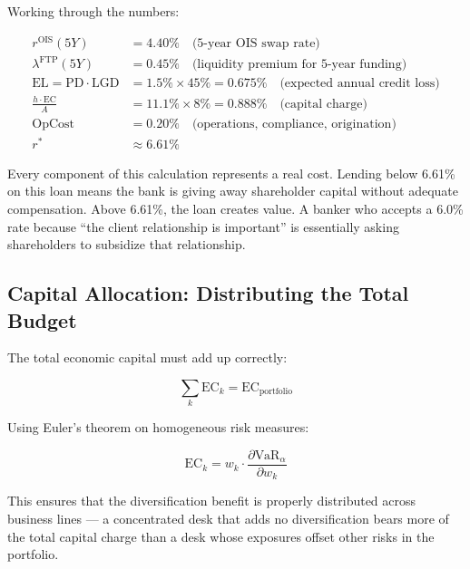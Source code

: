 \documentclass[12pt,a4paper]{article}
\begin{document}
Working through the numbers:

\begin{align}
  r^{\text{OIS}}(5Y) &= 4.40\% \quad \text{(5-year OIS swap rate)} \\
  \lambda^{\text{FTP}}(5Y) &= 0.45\% \quad \text{(liquidity premium for 5-year funding)} \\
  \text{EL} = \text{PD} \cdot \text{LGD} &= 1.5\% \times 45\% = 0.675\% \quad \text{(expected annual credit loss)} \\
  \frac{h \cdot \text{EC}}{A} &= 11.1\% \times 8\% = 0.888\% \quad \text{(capital charge)} \\
  \text{OpCost} &= 0.20\% \quad \text{(operations, compliance, origination)} \\
  \hline
  r^* &\approx \mathbf{6.61\%}
\end{align}

\begin{mdframed}[style=plainenglish]
Every component of this calculation represents a real cost.  Lending below
6.61\% on this loan means the bank is giving away shareholder capital without
adequate compensation.  Above 6.61\%, the loan creates value.  A banker who
accepts a 6.0\% rate because ``the client relationship is important'' is
essentially asking shareholders to subsidize that relationship.
\end{mdframed}

\subsection{Capital Allocation: Distributing the Total Budget}

The total economic capital must add up correctly:

\begin{equation}
  \sum_k \text{EC}_k = \text{EC}_{\text{portfolio}}
\end{equation}

Using Euler's theorem on homogeneous risk measures:

\begin{equation}
  \text{EC}_k = w_k \cdot \frac{\partial \text{VaR}_\alpha}{\partial w_k}
\end{equation}

This ensures that the diversification benefit is properly distributed
across business lines --- a concentrated desk that adds no diversification
bears more of the total capital charge than a desk whose exposures offset
other risks in the portfolio.
\end{document}
